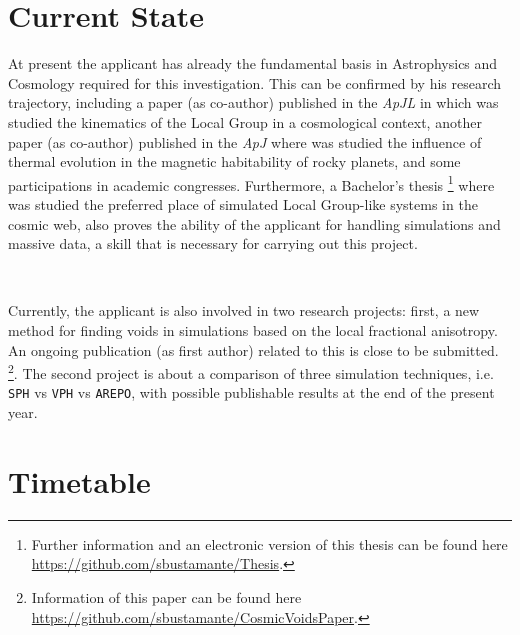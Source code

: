 \documentclass[a4,useAMS,usenatbib,usegraphicx,12pt]{article}
\begin{document}
\section{Current State}


At present the applicant has already the fundamental basis in Astrophysics and
Cosmology required for this investigation. This can be confirmed by his research 
trajectory, including a paper (as co-author) published in the \textit{ApJL} in 
which was studied the kinematics of the Local Group in a cosmological context, 
another paper (as co-author) published in the \textit{ApJ} where was studied the 
influence of thermal evolution in the magnetic habitability of rocky planets, and 
some participations in academic congresses. Furthermore, a Bachelor's thesis
\footnote{Further information and an electronic version of this thesis can be 
found here \url{https://github.com/sbustamante/Thesis}.} where was studied the 
preferred place of simulated Local Group-like systems in the cosmic web, also 
proves the ability of the applicant for handling simulations and massive data, 
a skill that is necessary for carrying out this project.

\

Currently, the applicant is also involved in two research projects: first, a 
new method for finding voids in simulations based on the local fractional 
anisotropy. An ongoing publication (as first author) related to this is close 
to be submitted. \footnote{Information of this paper can be found here 
\url{https://github.com/sbustamante/CosmicVoidsPaper}.}. The second project is
about a comparison of three simulation techniques, i.e. \texttt{SPH} vs 
\texttt{VPH} vs \texttt{AREPO}, with possible publishable results at the end of
the present year.

\section{Timetable}
\end{document}
